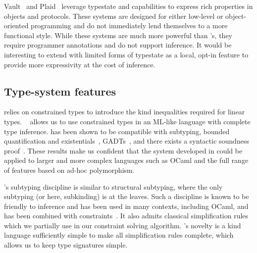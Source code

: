 Vault~\citep{DBLP:conf/pldi/DeLineF01}
and Plaid~\citep{DBLP:conf/oopsla/AldrichSSS09}
leverage typestate and capabilities
to express rich properties in objects and protocols.
These systems are designed for either low-level or object-oriented
programming and do not immediately lend themselves to a more functional
style. While these systems are much more
powerful than \affe's, they require programmer annotations
and do not support inference.
It  would be interesting to extend \lang with limited
forms of typestate as a local, opt-in feature to provide
more expressivity at the cost of inference.

\subsection{Type-system features}
%
\lang relies on constrained types
to introduce the kind inequalities required for linear types.
\hmx~\citep{DBLP:journals/tapos/OderskySW99} 
allows us to use constrained types in an ML-like language with complete
type inference.
\hmx has been shown to be compatible with subtyping,
bounded quantification and existentials~\citep{DBLP:conf/icfp/Simonet03},
GADTs~\citep{DBLP:journals/toplas/SimonetP07},
and there exists a syntactic soundness proof~\citep{DBLP:journals/entcs/SkalkaP02}.
These results make us confident that the system developed in \lang
could be applied to larger and more complex languages such as OCaml
and the full range of features based on ad-hoc polymorphism.

\lang's  subtyping discipline is similar
to structural subtyping, where the only subtyping (or here, subkinding)
is at the leaves.
Such a discipline is known to be friendly to inference and has been used in many
contexts, including OCaml, and has been combined
with constraints~\citep{DBLP:journals/tapos/OderskySW99,DBLP:conf/sas/TrifonovS96}.
It also admits classical simplification rules
\citep{DBLP:conf/aplas/Simonet03,DBLP:conf/popl/PottierS02} which we partially use
in our constraint solving algorithm.
\affe's novelty is a kind language
sufficiently simple to make
all simplification rules complete, which allows us to keep type signatures simple.


